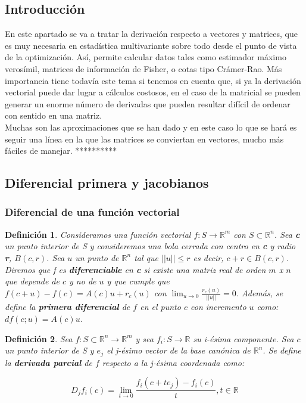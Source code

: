 \documentclass{article}
\theoremstyle{theorem-style}  %
\theoremstyle{definition-style}
\newtheorem{definition}{Definición}[section]
\theoremstyle{example-style}
\theoremstyle{exercise-style}
\begin{document}
	\subsection{Introducción}
	
	En este apartado se va a tratar la derivación respecto a vectores y matrices, que es muy necesaria en estadística multivariante sobre todo desde el punto de vista de la optimización. Así, permite calcular datos tales como estimador máximo verosímil, matrices de información de Fisher, o cotas tipo Crámer-Rao. Más importancia tiene todavía este tema si tenemos en cuenta que, si ya la derivación vectorial puede dar lugar a cálculos costosos, en el caso de la matricial se pueden generar un enorme número de derivadas que pueden resultar difícil de ordenar con sentido en una matriz. \\
	
	Muchas son las aproximaciones que se han dado y en este caso lo que se hará es seguir una línea en la que las matrices se conviertan en vectores, mucho más fáciles de manejar. **********
	
	\subsection{Diferencial primera y jacobianos}
	
	\subsubsection{Diferencial de una función vectorial}
	
	\begin{definition}
		Consideramos una función vectorial $f: S \rightarrow \mathbb{R}^m$ con $S\subset \mathbb{R}^n$. Sea \textbf{c} un punto interior de S y consideremos una bola cerrada con centro en \textbf{c} y radio \textbf{r}, $B(c,r)$. Sea $u$ un punto de $\mathbb{R}^n$ tal que $||u||\leq r$ es decir, $c+r \in B(c,r)$.\\ 
		Diremos que f es \textbf{diferenciable} en \textbf{c} si existe una matriz real de orden $m$ x $n$ que depende de $c$ y no de $u$ y que cumple que $f(c+u)-f(c) = A(c)u + r_c(u)$ con $\lim_{u\to0} \frac{r_c(u)}{||u||} = 0$. Además, se define la \textbf{primera diferencial} de $f$ en el punto $c$ con incremento $u$ como: $df(c;u)=A(c)u$.
	\end{definition}
	
	\begin{definition}
		
		Sea $f: S\subset \mathbb{R}^n \rightarrow \mathbb{R}^m$ y sea $f_i: S \rightarrow \mathbb{R}$ su i-ésima componente. Sea $c$ un punto interior de S y $e_j$ el j-ésimo vector de la base canónica de $\mathbb{R}^n$. Se define la \textbf{derivada parcial} de $f$ respecto a la j-ésima coordenada como: 
		
		$$ D_jf_i(c) = \lim_{t\to0} \frac{f_i(c + te_j ) - f_i(c)}{t}, t\in \mathbb{R} $$  
	\end{definition}
	
\end{document}
